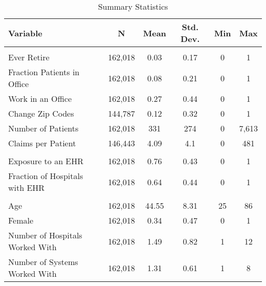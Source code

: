 


\begin{table}[ht]

\caption{Summary Statistics}
\centering
\begin{tabular}[t]{lccccc}
\toprule
Variable & N & Mean & Std. Dev. & Min & Max\\
\midrule
\addlinespace[0.3em]
\multicolumn{6}{l}{\textbf{Outcomes}}\\
\hspace{1em}Ever Retire & 162,018 & 0.03 & 0.17 & 0 & 1\\
\hspace{1em}Fraction Patients in Office & 162,018 & 0.08 & 0.21 & 0 & 1\\
\hspace{1em}Work in an Office & 162,018 & 0.27 & 0.44 & 0 & 1\\
\hspace{1em}Change Zip Codes & 144,787 & 0.12 & 0.32 & 0 & 1\\
\hspace{1em}Number of Patients & 162,018 & 331 & 274 & 0 & 7,613\\
\hspace{1em}Claims per Patient & 146,443 & 4.09 & 4.1 & 0 & 481\\
\addlinespace[0.3em]
\multicolumn{6}{l}{\textbf{Treatment}}\\
\hspace{1em}Exposure to an EHR & 162,018 & 0.76 & 0.43 & 0 & 1\\
\hspace{1em}Fraction of Hospitals with EHR & 162,018 & 0.64 & 0.44 & 0 & 1\\
\addlinespace[0.3em]
\multicolumn{6}{l}{\textbf{Characteristics}}\\
\hspace{1em}Age & 162,018 & 44.55 & 8.31 & 25 & 86\\
\hspace{1em}Female & 162,018 & 0.34 & 0.47 & 0 & 1\\
\hspace{1em}Number of Hospitals Worked With & 162,018 & 1.49 & 0.82 & 1 & 12\\
\hspace{1em}Number of Systems Worked With & 162,018 & 1.31 & 0.61 & 1 & 8\\
\bottomrule
\end{tabular}
\end{table}
\label{tab:sumstats}